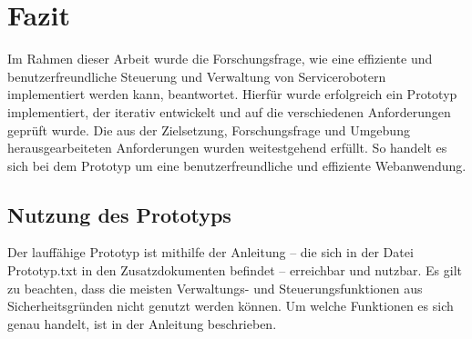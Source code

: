 \newpage
\section{Fazit}
Im Rahmen dieser Arbeit wurde die Forschungsfrage, wie eine effiziente und benutzerfreundliche Steuerung und Verwaltung von Servicerobotern implementiert werden kann, beantwortet. Hierfür wurde erfolgreich ein Prototyp implementiert, der iterativ entwickelt und auf die verschiedenen Anforderungen geprüft wurde. Die aus der Zielsetzung, Forschungsfrage und Umgebung herausgearbeiteten Anforderungen wurden weitestgehend erfüllt. So handelt es sich bei dem Prototyp um eine benutzerfreundliche und effiziente Webanwendung.

\subsection{Nutzung des Prototyps}
Der lauffähige Prototyp ist mithilfe der Anleitung – die sich in der Datei Prototyp.txt in den Zusatzdokumenten befindet – erreichbar und nutzbar. Es gilt zu beachten, dass die meisten Verwaltungs- und Steuerungsfunktionen aus Sicherheitsgründen nicht genutzt werden können. Um welche Funktionen es sich genau handelt, ist in der Anleitung beschrieben.


